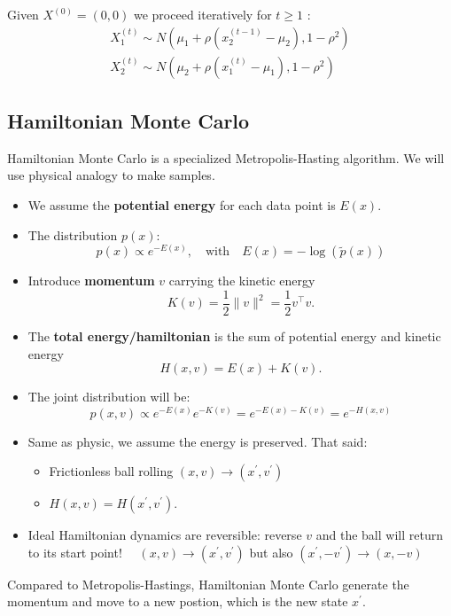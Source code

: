 Given $X^{(0)}=(0,0)$ we proceed iteratively for $t \geq 1$ :
$$
\begin{gathered}
X_1^{(t)} \sim N\left(\mu_1+\rho\left(x_2^{(t-1)}-\mu_2\right), 1-\rho^2\right) \\
X_2^{(t)} \sim N\left(\mu_2+\rho\left(x_1^{(t)}-\mu_1\right), 1-\rho^2\right)
\end{gathered}
$$

\subsection{Hamiltonian Monte Carlo}
Hamiltonian Monte Carlo is a specialized Metropolis-Hasting algorithm. We will use physical analogy to make samples.
\begin{itemize}
    \item We assume the \textbf{potential energy} for each data point is $E(x)$.
    \item The distribution $p(x)$:
    $$p(x) \propto e^{-E(x)}, \quad\text{with}\quad E(x)=-\log (\tilde{p}(x))$$
    \item Introduce \textbf{momentum} $v$ carrying the kinetic energy
    $$
    K(v)=\frac{1}{2}\|v\|^2=\frac{1}{2} v^{\top} v .
    $$
    \item The \textbf{total energy/hamiltonian} is the sum of potential energy and kinetic energy
    $$
    H(x, v)=E(x)+K(v) .
    $$
    \item The joint distribution will be:
    $$p(x, v) \propto e^{-E(x)} e^{-K(v)}=e^{-E(x)-K(v)}=e^{-H(x, v)}$$
    \item Same as physic, we assume the energy is preserved. That said:
    \begin{itemize}
        \item Frictionless ball rolling $(x, v) \rightarrow\left(x^{\prime}, v^{\prime}\right)$
        \item $H(x, v)=H\left(x^{\prime}, v^{\prime}\right)$.
    \end{itemize}
    \item Ideal Hamiltonian dynamics are reversible: reverse $v$ and the ball will return to its start point! $\quad(x, v) \rightarrow\left(x^{\prime}, v^{\prime}\right)$ but also $\left(x^{\prime},-v^{\prime}\right) \rightarrow(x,-v)$
\end{itemize}
Compared to Metropolis-Hastings, Hamiltonian Monte Carlo generate the momentum and move to a new postion, which is the new state $x^\prime$.
